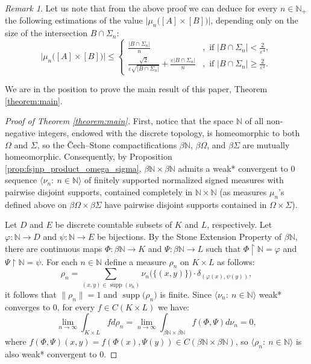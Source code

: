 \documentclass[11pt]{amsart}
\newtheorem{theorem}{Theorem}[section]
\theoremstyle{definition}
\theoremstyle{remark}
\newtheorem{remark}[theorem]{Remark}
\numberwithin{equation}{section}
\newcommand{\eps}{\varepsilon}
\newcommand{\N}{\mathbb{N}}
\newcommand{\rstr}{\restriction}
\DeclareMathOperator{\supp}{supp}
\newcommand{\seqn}[1]{\big\langle#1\colon\ n\io\big\rangle}
\newcommand{\io}{\in\mathbb{N}}%
\begin{document}

\begin{remark}
Let us note that from the above proof we can deduce for every $n\io_+$ the following estimations of the value $\big|\mu_n\big([A]\times[B]\big)\big|$, depending only on the size of the intersection $B\cap\Sigma_n$:
\[
\big|\mu_n\big([A]\times[B]\big)\big|\le
\begin{cases}
\frac{|B\cap\Sigma_n|}{n}&,\text{ if }\big|B\cap\Sigma_n\big|<\frac{2}{\eps^4},\\
\frac{\sqrt{2}}{\eps\sqrt{|B\cap\Sigma_n|}}+\frac{\eps|B\cap\Sigma_n|}{n}&,\text{ if }|B\cap\Sigma_n|\ge\frac{2}{\eps^4}.
\end{cases}
\]
\end{remark}

\medskip

We are in the position to prove the main result of this paper, Theorem \ref{theorem:main}.

\begin{proof}[Proof of Theorem \ref{theorem:main}]
First, notice that the space $\N$ of all non-negative integers, endowed with the discrete topology, is homeomorphic to both $\Omega$ and $\Sigma$, so the \v{C}ech--Stone compactifications $\beta\N$, $\beta\Omega$, and $\beta\Sigma$ are mutually homeomorphic. Consequently, by Proposition \ref{prop:fsjnp_product_omega_sigma}, $\beta\N\times\beta\N$ admits a weak* convergent to $0$ sequence $\seqn{\nu_n}$ of finitely supported normalized signed measures with pairwise disjoint supports, contained completely in $\N\times\N$ (as measures $\mu_n$'s defined above on $\beta\Omega\times\beta\Sigma$ have pairwise disjoint supports contained in $\Omega\times\Sigma$).

Let $D$ and $E$ be discrete countable subsets of $K$ and $L$, respectively. Let $\varphi\colon\N\to D$ and $\psi\colon\N\to E$ be bijections. By the Stone Extension Property of $\beta\N$, there are continuous maps $\Phi\colon\beta\N\to K$ and $\Psi\colon\beta\N\to L$ such that $\Phi\rstr\N=\varphi$ and $\Psi\rstr\N=\psi$. For each $n\io$ define a measure $\rho_n$ on $K\times L$ as follows:
\[\rho_n=\sum_{(x,y)\in\supp(\nu_n)}\nu_n\big(\{(x,y)\}\big)\cdot\delta_{(\varphi(x),\psi(y))},\]
it follows that $\big\|\rho_n\big\|=1$ and $\supp\big(\rho_n\big)$ is finite. Since $\seqn{\nu_n}$ weak* converges to $0$, for every $f\in C(K\times L)$ we have:
\[\lim_{n\to\infty}\int_{K\times L}fd\rho_n=\lim_{n\to\infty}\int_{\beta\N\times\beta\N}f(\Phi,\Psi)d\nu_n=0,\]
where $f(\Phi,\Psi)(x,y)=f(\Phi(x),\Psi(y))\in C(\beta\N\times\beta\N)$, so $\seqn{\rho_n}$ is also weak* convergent to $0$.
\end{proof}
\end{document}

